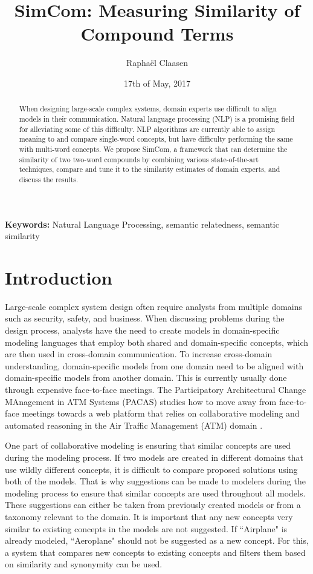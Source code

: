 \documentclass{article}
\title{SimCom: Measuring Similarity of Compound Terms}
\date{17th of May, 2017}
\author{Rapha\"el Claasen}
\begin{document}
\maketitle

\begin{abstract}
When designing large-scale complex systems, domain experts use difficult to align models in their communication. Natural language processing (NLP) is a promising field for alleviating some of this difficulty. NLP algorithms are currently able to assign meaning to and compare single-word concepts, but have difficulty performing the same with multi-word concepts. We propose SimCom, a framework that can determine the similarity of two two-word compounds by combining various state-of-the-art techniques, compare and tune it to the similarity estimates of domain experts, and discuss the results.
\end{abstract}

{\bf Keywords:} Natural Language Processing, semantic relatedness, semantic similarity

\section{Introduction} \label{sec:introduction}

Large-scale complex system design often require analysts from multiple domains such as security, safety, and business. When discussing problems during the design process, analysts have the need to create models in domain-specific modeling languages that employ both shared and domain-specific concepts, which are then used in cross-domain communication. To increase cross-domain understanding, domain-specific models from one domain need to be aligned with domain-specific models from another domain. This is currently usually done through expensive face-to-face meetings. The Participatory Architectural Change MAnagement in ATM Systems (PACAS) studies how to move away from face-to-face meetings towards a web platform that relies on collaborative modeling and automated reasoning in the Air Traffic Management (ATM) domain \cite{aydemir2017towards}.

One part of collaborative modeling is ensuring that similar concepts are used during the modeling process. If two models are created in different domains that use wildly different concepts, it is difficult to compare proposed solutions using both of the models. That is why suggestions can be made to modelers during the modeling process to ensure that similar concepts are used throughout all models. These suggestions can either be taken from previously created models or from a taxonomy relevant to the domain. It is important that any new concepts very similar to existing concepts in the models are not suggested. If ``Airplane" is already modeled, ``Aeroplane" should not be suggested as a new concept. For this, a system that compares new concepts to existing concepts and filters them based on similarity and synonymity can be used.
\end{document}
